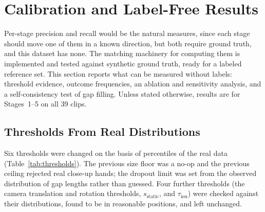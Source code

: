 \documentclass[journal]{IEEEtran}
\begin{document}
\section{Calibration and Label-Free Results}
\label{sec:results}

Per-stage precision and recall would be the natural measures, since each stage should move one of them in a known direction, but both require ground truth, and this dataset has none. The matching machinery for computing them is implemented and tested against synthetic ground truth, ready for a labeled reference set. This section reports what can be measured without labels: threshold evidence, outcome frequencies, an ablation and sensitivity analysis, and a self-consistency test of gap filling. Unless stated otherwise, results are for Stages~1--5 on all 39 clips.

\subsection{Thresholds From Real Distributions}
Six thresholds were changed on the basis of percentiles of the real data (Table~\ref{tab:thresholds}). The previous size floor was a no-op and the previous ceiling rejected real close-up hands; the dropout limit was set from the observed distribution of gap lengths rather than guessed. Four further thresholds (the camera translation and rotation thresholds, $s_{\mathrm{static}}$, and $\tau_{\mathrm{iou}}$) were checked against their distributions, found to be in reasonable positions, and left unchanged.
\end{document}
